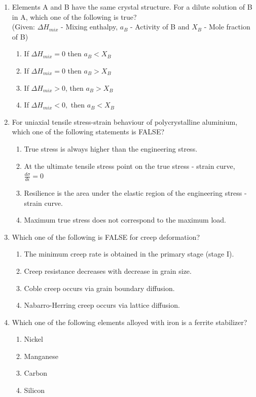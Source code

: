 \documentclass[journal]{IEEEtran}
\theoremstyle{remark}
\begin{document}
\begin{enumerate}
\item Elements A and B have the same crystal structure. For a dilute solution of B in A, which one of the following is true? \hfill{} \\ (Given: $\Delta H_{mix}$ - Mixing enthalpy, $a_{B}$ - Activity of B and $X_{B}$ - Mole fraction of B)
\begin{multicols}{2}
\begin{enumerate}
\item If $\Delta H_{mix}=0$ then $a_{B}<X_{B}$
\item If $\Delta H_{mix}=0$ then $a_{B}>X_{B}$
\item If $\Delta H_{mix}>0$, then $a_{B}>X_{B}$
\item If $\Delta H_{mix}<0,$ then $a_{B}<X_{B}$
\end{enumerate}
\end{multicols}

\item For uniaxial tensile stress-strain behaviour of polycrystalline aluminium, which one of the following statements is FALSE? \hfill{}
\begin{enumerate}
\item True stress is always higher than the engineering stress.
\item At the ultimate tensile stress point on the true stress - strain curve, $\frac{d\sigma}{d\epsilon}=0$
\item Resilience is the area under the elastic region of the engineering stress - strain curve.
\item Maximum true stress does not correspond to the maximum load.
\end{enumerate}

\item Which one of the following is FALSE for creep deformation? \hfill{}
\begin{enumerate}
\item The minimum creep rate is obtained in the primary stage (stage I).
\item Creep resistance decreases with decrease in grain size.
\item Coble creep occurs via grain boundary diffusion.
\item Nabarro-Herring creep occurs via lattice diffusion.
\end{enumerate}

\item Which one of the following elements alloyed with iron is a ferrite stabilizer? \hfill{}
\begin{multicols}{4}
\begin{enumerate}
\item Nickel
\item Manganese
\item Carbon
\item Silicon
\end{enumerate}
\end{multicols}


\end{enumerate}
\end{document}
